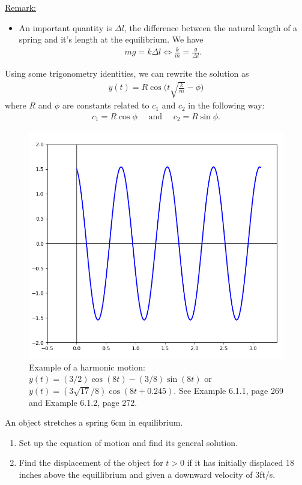 \documentclass[12pt,a4paper]{article}
\newcounter{example}[section]
\begin{document}
	\underline{Remark:}
	\begin{itemize}
	\item An important quantity is $\Delta l$, the difference between the natural length of a spring and it's length at the equilibrium. We have
		\begin{align*}
		mg = k \Delta l \iff \frac{k}{m} = \frac{g}{\Delta l} .
		\end{align*}
	\end{itemize}
	
Using some trigonometry identities, we can rewrite the solution as
	\begin{align*}
	y(t) = R \cos \Big( t \sqrt{\frac{k}{m}} - \phi \Big)
	\end{align*}
where $R$ and $\phi$ are constants related to $c_1$ and $c_2$ in the following way:
	\begin{align*}
	c_1 = R\cos \phi \quad \text{ and } \quad c_2 =  R \sin \phi .
	\end{align*}
	
	
	\begin{figure}[ht]
	\centering
	\includegraphics[scale=0.4]{fig1.png}
	\caption{Example of a harmonic motion: $y(t) = (3/2) \cos (8t) - (3/8) \sin (8t)$ or $y(t) = (3\sqrt{17}/8) \cos (8t + 0.245)$. See Example 6.1.1, page 269 and Example 6.1.2, page 272.}
	\end{figure}


	
	
\begin{notes}
\begin{example}
An object stretches a spring $6$cm in equilibrium.
\begin{enumerate}[label=\textbf{(\alph*)}]
\item Set up the equation of motion and find its general solution.
\item Find the displacement of the object for $t > 0$ if it has initially displaced 18 inches above the equillibrium and given a downward velocity of 3ft/s.
\end{enumerate}
\end{example}
\end{notes}
\end{document}
